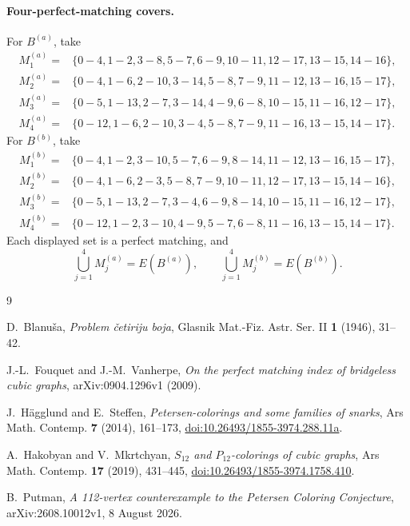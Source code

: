 \documentclass[11pt]{amsart}
\newcommand{\Ba}{B^{(a)}}
\newcommand{\Bb}{B^{(b)}}
\newcommand{\uv}[2]{#1\!-\!#2}
\newcommand{\doi}[1]{\href{https://doi.org/#1}{doi:#1}}
\begin{document}
\paragraph{Four-perfect-matching covers.}
For $\Ba$, take
\begingroup\footnotesize
\begin{align*}
M^{(a)}_1={}&\{\uv{0}{4},\uv{1}{2},\uv{3}{8},\uv{5}{7},\uv{6}{9},
\uv{10}{11},\uv{12}{17},\uv{13}{15},\uv{14}{16}\},\\
M^{(a)}_2={}&\{\uv{0}{4},\uv{1}{6},\uv{2}{10},\uv{3}{14},\uv{5}{8},
\uv{7}{9},\uv{11}{12},\uv{13}{16},\uv{15}{17}\},\\
M^{(a)}_3={}&\{\uv{0}{5},\uv{1}{13},\uv{2}{7},\uv{3}{14},\uv{4}{9},
\uv{6}{8},\uv{10}{15},\uv{11}{16},\uv{12}{17}\},\\
M^{(a)}_4={}&\{\uv{0}{12},\uv{1}{6},\uv{2}{10},\uv{3}{4},\uv{5}{8},
\uv{7}{9},\uv{11}{16},\uv{13}{15},\uv{14}{17}\}.
\end{align*}
\endgroup
For $\Bb$, take
\begingroup\footnotesize
\begin{align*}
M^{(b)}_1={}&\{\uv{0}{4},\uv{1}{2},\uv{3}{10},\uv{5}{7},\uv{6}{9},
\uv{8}{14},\uv{11}{12},\uv{13}{16},\uv{15}{17}\},\\
M^{(b)}_2={}&\{\uv{0}{4},\uv{1}{6},\uv{2}{3},\uv{5}{8},\uv{7}{9},
\uv{10}{11},\uv{12}{17},\uv{13}{15},\uv{14}{16}\},\\
M^{(b)}_3={}&\{\uv{0}{5},\uv{1}{13},\uv{2}{7},\uv{3}{4},\uv{6}{9},
\uv{8}{14},\uv{10}{15},\uv{11}{16},\uv{12}{17}\},\\
M^{(b)}_4={}&\{\uv{0}{12},\uv{1}{2},\uv{3}{10},\uv{4}{9},\uv{5}{7},
\uv{6}{8},\uv{11}{16},\uv{13}{15},\uv{14}{17}\}.
\end{align*}
\endgroup
Each displayed set is a perfect matching, and
\[
  \bigcup_{j=1}^{4}M^{(a)}_j=E(\Ba),
  \qquad
  \bigcup_{j=1}^{4}M^{(b)}_j=E(\Bb).
\]

\enlargethispage{3\baselineskip}
\begin{thebibliography}{9}
\footnotesize
\setlength{\itemsep}{0.1em}

D.~Blanu\v{s}a,
\emph{Problem \v{c}etiriju boja},
Glasnik Mat.-Fiz. Astr. Ser. II \textbf{1} (1946), 31--42.

J.-L.~Fouquet and J.-M.~Vanherpe,
\emph{On the perfect matching index of bridgeless cubic graphs},
arXiv:0904.1296v1 (2009).

J.~H\"agglund and E.~Steffen,
\emph{Petersen-colorings and some families of snarks},
Ars Math. Contemp. \textbf{7} (2014), 161--173,
\doi{10.26493/1855-3974.288.11a}.

A.~Hakobyan and V.~Mkrtchyan,
\emph{$S_{12}$ and $P_{12}$-colorings of cubic graphs},
Ars Math. Contemp. \textbf{17} (2019), 431--445,
\doi{10.26493/1855-3974.1758.410}.

B.~Putman,
\emph{A 112-vertex counterexample to the Petersen Coloring Conjecture},
arXiv:2608.10012v1, 8 August 2026.

\end{thebibliography}
\end{document}
